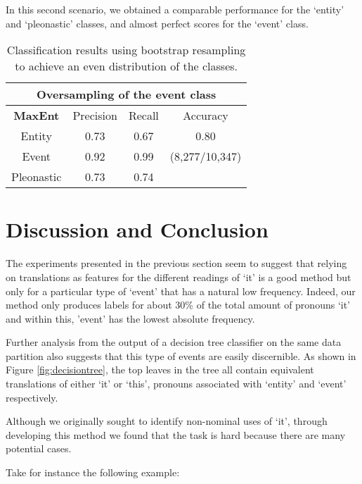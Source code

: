 \documentclass[10pt, a4paper]{article} \usepackage{lrec} \usepackage{multibib}
\begin{document}
In this second scenario, we obtained a comparable performance for the `entity' and `pleonastic' classes, and almost perfect scores for the `event' class. 

\begin{center} \begin{table}[h!] \begin{tabular}{cccc}
\multicolumn{4}{c}{\textbf{Oversampling of the event class}}\\ 
\toprule
\textbf{MaxEnt}& Precision & Recall & Accuracy \\ 
\midrule 
 Entity & 0.73 &0.67& 0.80 \\ 
 Event & 0.92 & 0.99 & (8,277/10,347) \\ 
  Pleonastic &  0.73 & 0.74 & \\
\bottomrule 
\end{tabular} 
\caption{Classification results using bootstrap
resampling to achieve an even distribution of the classes.}\label{tab:maxentoversampling}
\end{table}
\end{center}


\section{Discussion and Conclusion}

The experiments presented in the previous section seem to suggest that relying on translations as features for the different readings of `it' is a good method but only for a particular type of `event' that has a natural low frequency. Indeed, our method only produces labels for about 30\% of the total amount of pronouns `it' and within this, 'event' has the lowest absolute frequency. 

Further analysis from the output of a decision tree classifier on the same data partition also suggests that this type of events are easily discernible. As shown in Figure \ref{fig:decisiontree}, the top leaves in the tree all contain equivalent translations of either `it' or `this', pronouns associated with `entity' and `event' respectively. 

Although we originally sought to identify non-nominal uses of `it', through developing this method we found that the task is hard because there are many potential
cases. 

Take for instance the following example:

\vspace{1em}
\end{document}

